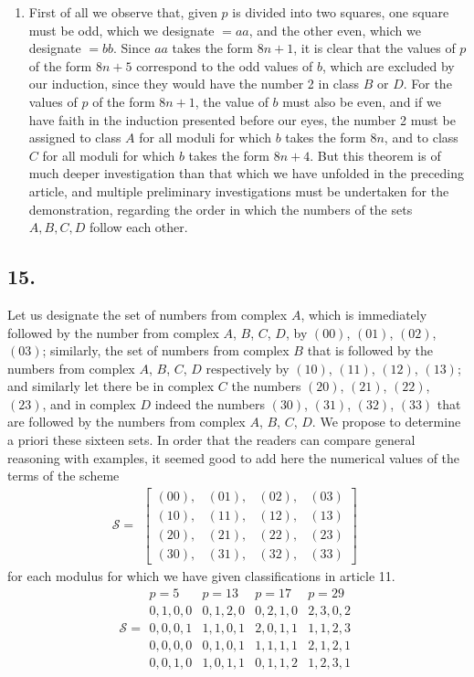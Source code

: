 \documentclass[twoside,12pt, showframe]{memoir}
\begin{document}
\begin{enumerate}
    \item First of all we observe that, given \(p\) is divided into two squares, one square must be odd, which we designate \(=a a\), and the other even, which we designate \(=b b\). Since \(a {a}\) takes the form \(8 n+1\), it is clear that the values of \(p\) of the form \(8 n+5\) correspond to the odd values of \(b\), which are excluded by our induction, since they would have the number 2 in class \(B\) or \(D\). For the values of \(p\) of the form \(8 n+1\), the value of \(b\) must also be even, and if we have faith in the induction presented before our eyes, the number 2 must be assigned to class \(A\) for all moduli for which \(b\) takes the form \(8 n\), and to class \(C\) for all moduli for which \(b\) takes the form \(8 n+4\). But this theorem is of much deeper investigation than that which we have unfolded in the preceding article, and multiple preliminary investigations must be undertaken for the demonstration, regarding the order in which the numbers of the sets \(A, B, C, D\) follow each other.
\end{enumerate}
%

\subsection*{15.}

Let us designate the set of numbers from complex \(A\), which is immediately followed by the number from complex \(A\), \(B\), \(C\), \(D\), by \((00)\), \((01)\), \((02)\), \((03)\); similarly, the set of numbers from complex \(B\) that is followed by the numbers from complex \(A\), \(B\), \(C\), \(D\) respectively by \((10)\), \((11)\), \((12)\), \((13)\); and similarly let there be in complex \(C\) the numbers \((20)\), \((21)\), \((22)\), \((23)\), and in complex \(D\) indeed the numbers \((30)\), \((31)\), \((32)\), \((33)\) that are followed by the numbers from complex \(A\), \(B\), \(C\), \(D\). We propose to determine a priori these sixteen sets. In order that the readers can compare general reasoning with examples, it seemed good to add here the numerical values of the terms of the scheme 
\[
\mathcal{S} = 
\begin{array}{c}
\begin{bmatrix}
(00), & (01), & (02), & (03) \\
(10), & (11), & (12), & (13) \\
(20), & (21), & (22), & (23) \\
(30), & (31), & (32), & (33)
\end{bmatrix}
\end{array}
\]
for each modulus for which we have given classifications in article 11.
\[
\mathcal{S} = 
\begin{array}{c|c|c|c}
p=5 & p=13 & p=17 & p=29 \\
0, 1, 0, 0 & 0, 1, 2, 0 & 0, 2, 1, 0 & 2, 3, 0, 2 \\
0, 0, 0, 1 & 1, 1, 0, 1 & 2, 0, 1, 1 & 1, 1, 2, 3 \\
0, 0, 0, 0 & 0, 1, 0, 1 & 1, 1, 1, 1 & 2, 1, 2, 1 \\
0, 0, 1, 0 & 1, 0, 1, 1 & 0, 1, 1, 2 & 1, 2, 3, 1
\end{array}
\]
\end{document}
